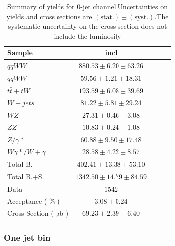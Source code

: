 \begin{table}[!ht]
{\small
\begin{center}
\begin{tabular}{|l|c|c|c|c|}
\hline
Sample	& incl	\\ \hline
$qqWW$	& $880.53 \pm 6.20 \pm 63.26 $	\\ 
$qqWW$	& $59.56 \pm 1.21 \pm 18.31 $	\\ 
$t\bar{t} + tW$	& $193.59 \pm 6.08 \pm 39.69 $	\\ 
$W+jets$	& $81.22 \pm 5.81 \pm 29.24 $	\\ 
$WZ$	& $27.31 \pm 0.46 \pm 3.08 $	\\ 
$ZZ$	& $10.83 \pm 0.24 \pm 1.08 $	\\ 
$Z/\gamma*$	& $60.88 \pm 9.50 \pm 17.48 $	\\ 
$W\gamma*/W+\gamma$	& $28.58 \pm 4.22 \pm 8.57 $	\\ 
\hline \hline 
Total B.	& $402.41 \pm 13.38 \pm 53.10 $	\\ \hline \hline 
Total B.+S.	& $1342.50 \pm 14.79 \pm 84.59 $	\\ \hline \hline
Data	& $1542$ 	\\ \hline \hline
Acceptance ( \% )	& $3.08 \pm 0.24 	$\\ 
Cross Section ( pb )	& $69.23 \pm 2.39 \pm 6.40$ 	\\ \hline
\end{tabular}
\caption{Summary of yields for 0-jet channel.Uncertainties on yields and cross sections are $\mathrm{(stat.)} \pm \mathrm{(syst.)}$.The systematic uncertainty on the cross section does not include the luminosity}
\label{tab:datayields_wwxsec_0j}
\end{center}}
\end{table}
\clearpage
\subsubsection{One jet bin}

